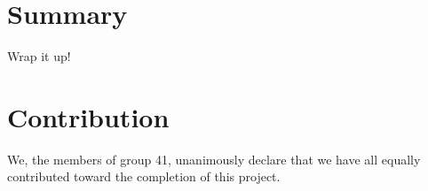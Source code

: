 \section{Summary}
Wrap it up! \lipsum[1-2]
\section{Contribution}
We, the members of group 41, unanimously declare that we have all equally contributed toward the completion of this project.